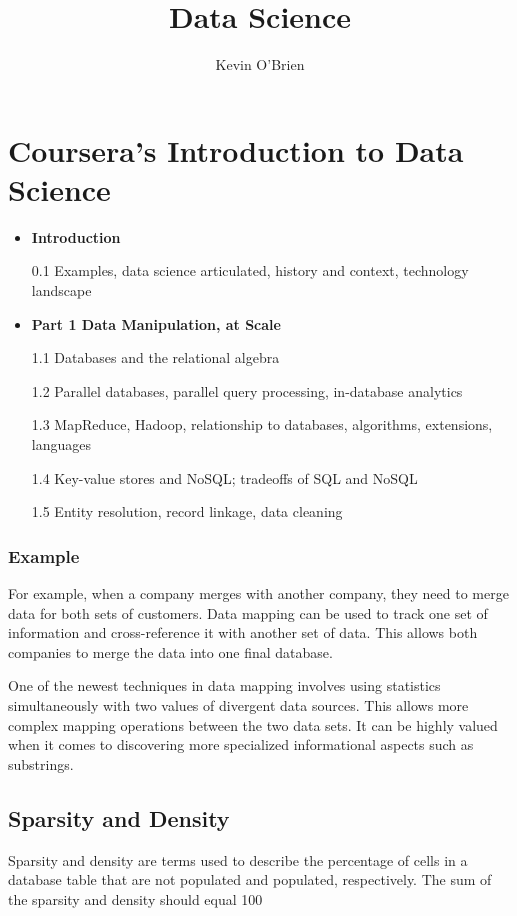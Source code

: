 \documentclass[12pt]{article}
\title{Data Science}
\author{Kevin O'Brien}
\begin{document}
\maketitle

\tableofcontents
\newpage
\section{Coursera's Introduction to Data Science}

\begin{itemize} 
\item \textbf{Introduction}
\item[0.1] Examples, data science articulated, history and context, technology landscape
\item \textbf{Part 1 Data Manipulation, at Scale}
\item[1.1] Databases and the relational algebra  
\item[1.2] Parallel databases, parallel query processing, in-database analytics \\
\item[1.3] MapReduce, Hadoop, relationship to databases, algorithms, extensions, languages  
\item[1.4] Key-value stores and NoSQL; tradeoffs of SQL and NoSQL
\item[1.5] Entity resolution, record linkage, data cleaning
\end{itemize}


\subsubsection{Example}
For example, when a company merges with another company, they need to merge data for both sets of customers. Data mapping can be used to track one set of information and cross-reference it with another set of data. This allows both companies to merge the data into one final database.

One of the newest techniques in data mapping involves using statistics simultaneously with two values of divergent data sources. This allows more complex mapping operations between the two data sets. It can be highly valued when it comes to discovering more specialized informational aspects such as substrings.

\subsection{Sparsity and Density}
Sparsity and density are terms used to describe the percentage of cells in a database table that are not populated and populated, respectively. The sum of the sparsity and density should equal 100%
\end{document}
